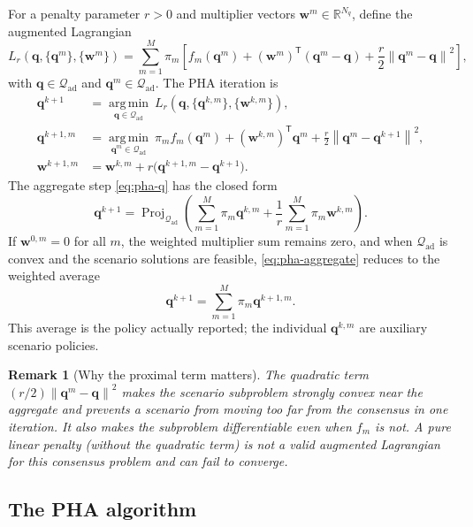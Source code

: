 \documentclass[11pt]{article}
\numberwithin{equation}{section}
\newcommand{\R}{\mathbb{R}}
\newcommand{\norm}[1]{\left\lVert #1 \right\rVert}
\newcommand{\qq}{\mathbf{q}}
\newcommand{\ww}{\mathbf{w}}
\newcommand{\T}{\mathsf{T}}
\newcommand{\argmin}{\operatorname*{arg\,min}}
\newcommand{\Proj}{\operatorname{Proj}}
\theoremstyle{plain}
\newtheorem{remark}{Remark}
\begin{document}
For a penalty parameter $r>0$ and multiplier vectors $\ww^m\in\R^{N_q}$,
define the augmented Lagrangian
\begin{equation}
\label{eq:pha-L}
L_r(\qq,\{\qq^m\},\{\ww^m\})
=\sum_{m=1}^{M}\pi_m\left[
f_m(\qq^m)
+(\ww^m)^{\T}(\qq^m-\qq)
+\frac{r}{2}\norm{\qq^m-\qq}^2
\right],
\end{equation}
with $\qq\in\mathcal{Q}_{\mathrm{ad}}$ and $\qq^m\in\mathcal{Q}_{\mathrm{ad}}$.
The PHA iteration is
\begin{align}
\qq^{k+1}
&=\argmin_{\qq\in\mathcal{Q}_{\mathrm{ad}}}\ L_r(\qq,\{\qq^{k,m}\},\{\ww^{k,m}\}),
\label{eq:pha-q}\\
\qq^{k+1,m}
&=\argmin_{\qq^m\in\mathcal{Q}_{\mathrm{ad}}}\
\pi_m f_m(\qq^m)+(\ww^{k,m})^{\T}\qq^m
+\frac{r}{2}\norm{\qq^m-\qq^{k+1}}^2,
\label{eq:pha-sub}\\
\ww^{k+1,m}
&=\ww^{k,m}+r\bigl(\qq^{k+1,m}-\qq^{k+1}\bigr).
\label{eq:pha-w}
\end{align}
The aggregate step \eqref{eq:pha-q} has the closed form
\begin{equation}
\label{eq:pha-aggregate}
\qq^{k+1}
=\Proj_{\mathcal{Q}_{\mathrm{ad}}}
\left(
\sum_{m=1}^{M}\pi_m\qq^{k,m}
+\frac{1}{r}\sum_{m=1}^{M}\pi_m\ww^{k,m}
\right).
\end{equation}
If $\ww^{0,m}=0$ for all $m$, the weighted multiplier sum remains zero, and
when $\mathcal{Q}_{\mathrm{ad}}$ is convex and the scenario solutions are
feasible, \eqref{eq:pha-aggregate} reduces to the weighted average
\begin{equation}
\label{eq:pha-average}
\qq^{k+1}=\sum_{m=1}^{M}\pi_m\qq^{k+1,m}.
\end{equation}
This average is the policy actually reported; the individual $\qq^{k,m}$ are
auxiliary scenario policies.

\begin{remark}[Why the proximal term matters]
The quadratic term $(r/2)\norm{\qq^m-\qq}^2$ makes the scenario subproblem
strongly convex near the aggregate and prevents a scenario from moving too far
from the consensus in one iteration.  It also makes the subproblem
differentiable even when $f_m$ is not.  A pure linear penalty (without the
quadratic term) is not a valid augmented Lagrangian for this consensus
problem and can fail to converge.
\end{remark}

\subsection{The PHA algorithm}
\end{document}
